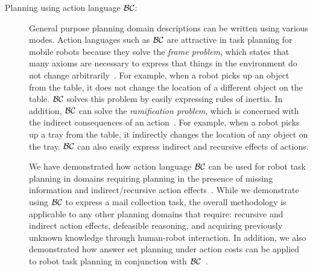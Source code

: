 \documentclass[runningheads,a4paper]{llncs}
\begin{document}
\begin{description}
\item[Planning using action language ${\cal BC}$:] 
General purpose planning domain descriptions can be written using
various modes. Action languages such as ${\cal BC}$ are attractive in
task planning for mobile robots because they solve the \emph{frame
problem}, which states that many axioms are necessary to express that
things in the environment do not change arbitrarily~\cite{mcc69}.
For example, when a robot picks up an object from the table, it does
not change the location of a different object on the table.  ${\cal
BC}$ solves this problem by easily expressing rules of inertia.  In
addition, ${\cal BC}$ can solve the \emph{ramification problem}, which
is concerned with the indirect consequences of an
action~\cite{fin86}.  For example, when a robot picks up a tray from
the table, it indirectly changes the location of any object on the
tray.  ${\cal BC}$ can also easily express indirect and recursive
effects of actions.


We have demonstrated how action language ${\cal BC}$ can be used for
robot task planning in domains requiring planning in the presence of
missing information and indirect/recursive action
effects~\cite{khandelwal2014planning}. While we demonstrate using
${\cal BC}$ to express a mail collection task, the overall methodology
is applicable to any other planning domains that require: recursive
and indirect action effects, defeasible reasoning, and acquiring
previously unknown knowledge through human-robot interaction. In
addition, we also demonstrated how answer set planning under action
costs \cite{eiter2003answer} can be applied to robot task planning in
conjunction with ${\cal BC}$~\cite{khandelwal2014planning}.



\end{description}
\end{document}
